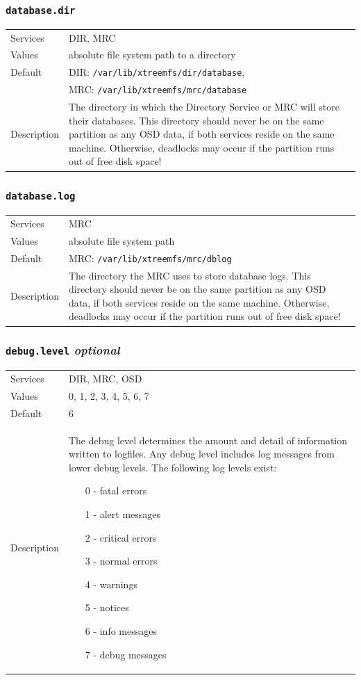 \documentclass[a4paper,10pt]{book}
\begin{document}
\subsubsection{\texttt{database.dir}}
\begin{tabular}{lp{10cm}}
 Services & DIR, MRC\\
 Values   & absolute file system path to a directory\\
 Default  & DIR: \texttt{/var/lib/xtreemfs/dir/database},\\
 & MRC: \texttt{/var/lib/xtreemfs/mrc/database}\\
 Description & The directory in which the Directory Service or MRC will store their databases. This directory should never be on the same partition as any OSD data, if both services reside on the same machine. Otherwise, deadlocks may occur if the partition runs out of free disk space!
\end{tabular}

\subsubsection{\texttt{database.log}}
\begin{tabular}{lp{10cm}}
 Services & MRC\\
 Values   & absolute file system path\\
 Default  & MRC: \texttt{/var/lib/xtreemfs/mrc/dblog}\\
 Description & The directory the MRC uses to store database logs. This directory should never be on the same partition as any OSD data, if both services reside on the same machine. Otherwise, deadlocks may occur if the partition runs out of free disk space!
\end{tabular}

\subsubsection{\texttt{debug.level} \textit{optional}}
\begin{tabular}{lp{10cm}}
 Services & DIR, MRC, OSD\\
 Values   & 0, 1, 2, 3, 4, 5, 6, 7 \\
 Default  & 6 \\
 Description & The debug level determines the amount and detail of information written to logfiles. Any debug level includes log messages from lower debug levels. The following log levels exist:
\begin{enumerate}
 \item[0 -] fatal errors
 \item[1 -] alert messages
 \item[2 -] critical errors
 \item[3 -] normal errors
 \item[4 -] warnings
 \item[5 -] notices
 \item[6 -] info messages
 \item[7 -] debug messages
\end{enumerate}
\end{tabular}
\end{document}
